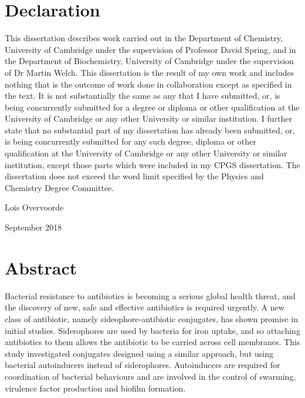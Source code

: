 \newpage

\section{Declaration}

This dissertation describes work carried out in the Department of Chemistry, University of Cambridge under the supervision of Professor David Spring, and in the Department of Biochemistry, University of Cambridge under the supervision of Dr Martin Welch. 
This dissertation is the result of my own work and includes nothing that is the outcome of work done in collaboration except as specified in the text. 
It is not substantially the same as any that I have submitted, or, is being concurrently submitted for a degree or diploma or other qualification at the University of Cambridge or any other University or similar institution. 
I further state that no substantial part of my dissertation has already been submitted, or, is being concurrently submitted for any such degree, diploma or other qualification at the University of Cambridge or any other University or similar institution, except those parts which were included in my CPGS dissertation.
The dissertation does not exceed the word limit specified by the Physics and Chemistry Degree Committee.








\vspace{5cm}



Lois Overvoorde

September 2018

\newpage

\section{Abstract}

Bacterial resistance to antibiotics is becoming a serious global health threat, and the discovery of new, safe and effective antibiotics is required urgently\cite{ResistanceUS,davies2013drugs,ANIE:ANIE201209979}. A new class of antibiotic, namely sideophore-antibiotic conjugates, has shown promise in initial studies\cite{Page2013,Schalk2017}. Siderophores are used by bacteria for iron uptake, and so attaching antibiotics to them allows the antibiotic to be carried across cell membranes. This study investigated conjugates designed using a similar approach, but using bacterial autoinducers\cite{Waters2005} instead of siderophores. Autoinducers are required for coordination of bacterial behaviours and are involved in the control of swarming, virulence factor production and biofilm formation\cite{Miller2001}. 


